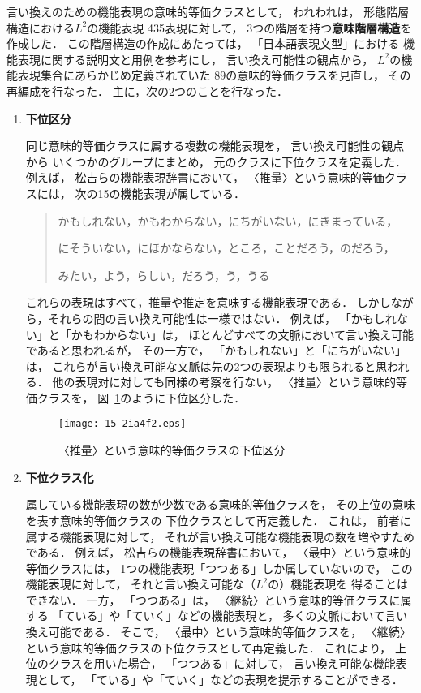 \documentclass[japanese]{jnlp_1.4}
\begin{document}
言い換えのための機能表現の意味的等価クラスとして，
われわれは，
形態階層構造における$L^2$の機能表現 435表現に対して，
3つの階層を持つ\textbf{意味階層構造}を作成した．
この階層構造の作成にあたっては，
「日本語表現文型」における
機能表現に関する説明文と用例を参考にし，
言い換え可能性の観点から，
$L^2$の機能表現集合にあらかじめ定義されていた
89の意味的等価クラスを見直し，
その再編成を行なった．
主に，次の2つのことを行なった．
\begin{enumerate}
\item \textbf{下位区分}

      同じ意味的等価クラスに属する複数の機能表現を，
      言い換え可能性の観点から      
      いくつかのグループにまとめ，
      元のクラスに下位クラスを定義した．
      例えば，
      松吉らの機能表現辞書において，
      〈推量〉という意味的等価クラスには，
      次の15の機能表現が属している．
\begin{quote}
かもしれない，かもわからない，にちがいない，にきまっている，

にそういない，にほかならない，ところ，ことだろう，のだろう，

みたい，よう，らしい，だろう，う，うる
\end{quote}
これらの表現はすべて，推量や推定を意味する機能表現である．
しかしながら，それらの間の言い換え可能性は一様ではない．
例えば，
「かもしれない」と「かもわからない」は，
ほとんどすべての文脈において言い換え可能であると思われるが，
その一方で，
「かもしれない」と「にちがいない」は，
これらが言い換え可能な文脈は先の2つの表現よりも限られると思われる．
他の表現対に対しても同様の考察を行ない，
〈推量〉という意味的等価クラスを，
図~\ref{fig:class}のように下位区分した．

\begin{figure}[b]
\begin{center}
\texttt{[image: 15-2ia4f2.eps]}
\caption{〈推量〉という意味的等価クラスの下位区分}
\label{fig:class}
\end{center}
\end{figure}

\item \textbf{下位クラス化}

      属している機能表現の数が少数である意味的等価クラスを，
      その上位の意味を表す意味的等価クラスの
      下位クラスとして再定義した．
      これは，
      前者に属する機能表現に対して，
      それが言い換え可能な機能表現の数を増やすためである．     
      例えば，
      松吉らの機能表現辞書において，
      〈最中〉という意味的等価クラスには，
      1つの機能表現「つつある」しか属していないので，
      この機能表現に対して，
      それと言い換え可能な（$L^2$の）機能表現を
      得ることはできない．
      一方，
      「つつある」は，
      〈継続〉という意味的等価クラスに属する
      「ている」や「ていく」などの機能表現と，
      多くの文脈において言い換え可能である．
      そこで，
      〈最中〉という意味的等価クラスを，
      〈継続〉という意味的等価クラスの下位クラスとして再定義した．
      これにより，
      上位のクラスを用いた場合，
      「つつある」に対して，
      言い換え可能な機能表現として，
      「ている」や「ていく」などの表現を提示することができる．
\end{enumerate}
\end{document}

